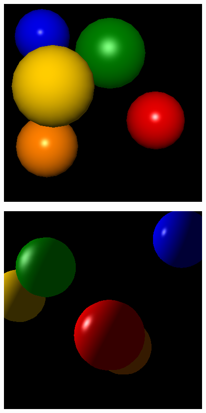 \documentclass{beamer}
\begin{document}
\begin{frame}
	\begin{figure}
		\includegraphics[height=.8\textheight]{oglscene01.png}
	\end{figure}
\end{frame}

\begin{frame}
	\begin{figure}
		\includegraphics[height=.8\textheight]{oglrot1.png}
	\end{figure}
\end{frame}
\end{document}
